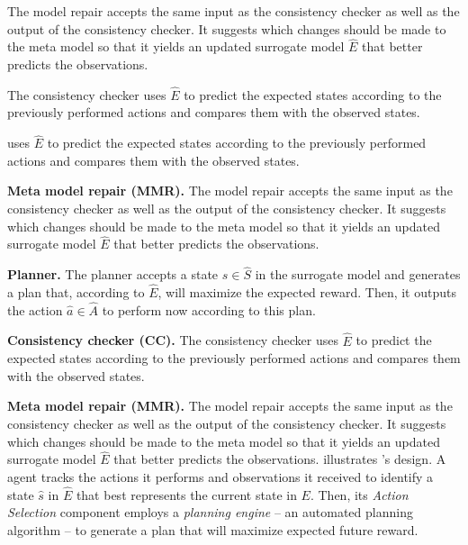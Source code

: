 



The model repair accepts the same input as the consistency checker as well as the output of the consistency checker. It suggests which changes should be made to the meta model so that it yields an updated surrogate model $\hat{E}$ that better predicts the observations. %


The consistency checker uses $\hat{E}$ to predict the expected states according to the previously performed actions and compares them with the observed states. 

uses $\hat{E}$ to predict the expected states according to the previously performed actions and compares them with the observed states. 
\item \textbf{Meta model repair (MMR).} The model repair accepts the same input as the consistency checker as well as the output of the consistency checker. It suggests which changes should be made to the meta model so that it yields an updated surrogate model $\hat{E}$ that better predicts the observations. %

\item \textbf{Planner.} The planner accepts a state $\hat{s}\in\hat{S}$ in the surrogate model and generates a plan that, according to $\hat{E}$, will maximize the expected reward. Then, it outputs the action $\hat{a}\in\hat{A}$ to perform now according to this plan.
\item \textbf{Consistency checker (CC).} The consistency checker uses $\hat{E}$ to predict the expected states according to the previously performed actions and compares them with the observed states. 
\item \textbf{Meta model repair (MMR).} The model repair accepts the same input as the consistency checker as well as the output of the consistency checker. It suggests which changes should be made to the meta model so that it yields an updated surrogate model $\hat{E}$ that better predicts the observations. %
illustrates \hydra's design. 
A \hydra agent tracks the actions it performs and observations it received to identify a state $\hat{s}$ in $\hat{E}$ that best represents the current state in $E$. 
Then, its \emph{Action Selection} component employs a \emph{planning engine} -- an automated planning algorithm -- to generate a plan that will maximize expected future reward. 

